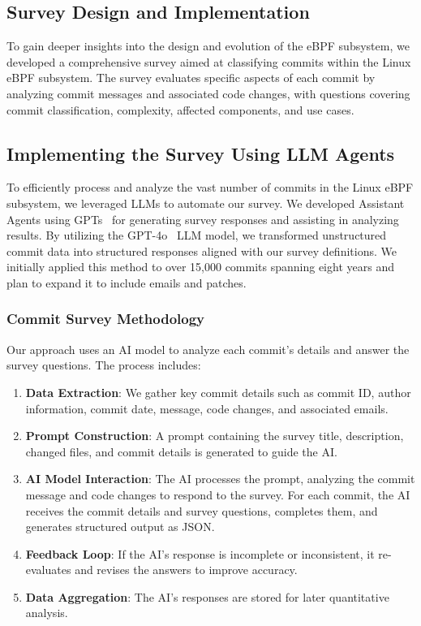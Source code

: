 \subsection{Survey Design and Implementation}

To gain deeper insights into the design and evolution of the eBPF subsystem, we developed a comprehensive survey aimed at classifying commits within the Linux eBPF subsystem. The survey evaluates specific aspects of each commit by analyzing commit messages and associated code changes, with questions covering commit classification, complexity, affected components, and use cases.

\subsection{Implementing the Survey Using LLM Agents}

To efficiently process and analyze the vast number of commits in the Linux eBPF subsystem, we leveraged LLMs to automate our survey. We developed Assistant Agents using GPTs~\cite{gpts} for generating survey responses and assisting in analyzing results. By utilizing the GPT-4o~\cite{gpt4o} LLM model, we transformed unstructured commit data into structured responses aligned with our survey definitions. We initially applied this method to over 15,000 commits spanning eight years and plan to expand it to include emails and patches.

\subsubsection{Commit Survey Methodology}

Our approach uses an AI model to analyze each commit's details and answer the survey questions. The process includes:

\begin{enumerate} 
\item \textbf{Data Extraction}: We gather key commit details such as commit ID, author information, commit date, message, code changes, and associated emails.
\item \textbf{Prompt Construction}: A prompt containing the survey title, description, changed files, and commit details is generated to guide the AI.
\item \textbf{AI Model Interaction}: The AI processes the prompt, analyzing the commit message and code changes to respond to the survey. For each commit, the AI receives the commit details and survey questions, completes them, and generates structured output as JSON.
\item \textbf{Feedback Loop}: If the AI's response is incomplete or inconsistent, it re-evaluates and revises the answers to improve accuracy.
\item \textbf{Data Aggregation}: The AI's responses are stored for later quantitative analysis.
\end{enumerate}

